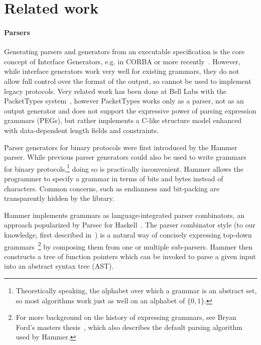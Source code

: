 \section{Related work}
\label{s:relwk}






\paragraph{Parsers}

Generating parsers and generators from an executable specification
is the core concept of Interface Generators, e.g. in CORBA or more
recently~\cite{varda2008}. However, while interface generators work
very well for existing grammars, they do not allow full control over the
format of the output, so cannot be used to implement legacy protocols.
Very related work has been done at Bell Labs with the PacketTypes
system~\cite{mccann2000packet}, however PacketTypes works only as a
parser, not as an output generator and does not support the expressive
power of parsing expression grammars (PEGs), but rather implements a
C-like structure model enhanced with data-dependent length fields and
constraints.

Parser generators for binary protocols were first introduced by the
Hammer~\cite{hammer-parser} parser.
While previous parser generators could also be used to write grammars
for binary protocols,\footnote{Theoretically speaking, the alphabet
over which a grammar is an  abstract set, so most algorithms work
just as well on an alphabet of $\{0,1\}$.} doing so is practically
inconvenient. Hammer allows the programmer to specify a grammar in
terms of bits and bytes instead of characters. Common concerns, such as
endianness and bit-packing are transparently hidden by the library. 

Hammer implements grammars as language-integrated parser combinators, an approach popularized by
Parsec for Haskell~\cite{LeijenMeijer:parsec}. The parser combinator style (to our knowledge, first
described in~\cite{burge1975recursive}) is a natural way of concisely expressing top-down
grammars~\cite{Danielsson:2010:TPC:1863543.1863585}\footnote{For more background on the history of
  expressing grammars, see Bryan Ford's masters thesis~\cite{ford2002packrat}, which also describes
  the default parsing algorithm used by Hammer.} by composing them from one or multiple sub-parsers.
Hammer then constructs a tree of function pointers which can be invoked to parse a given input into
an abstract syntax tree (AST).

